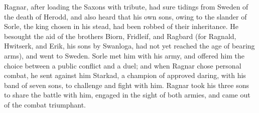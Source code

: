 \documentclass[10pt,a4paper]{report}
\begin{document}
Ragnar, after loading the Saxons with tribute, had sure tidings from Sweden of the death of Herodd, and also heard that his own sons, owing to the slander of Sorle, the king chosen in his stead, had been robbed of their inheritance. He besought the aid of the brothers Biorn, Fridleif, and Ragbard (for Ragnald, Hwitserk, and Erik, his sons by Swanloga, had not yet reached the age of bearing arms), and went to Sweden. Sorle met him with his army, and offered him the choice between a public conflict and a duel; and when Ragnar chose personal combat, he sent against him Starkad, a champion of approved daring, with his band of seven sons, to challenge and fight with him. Ragnar took his three sons to share the battle with him, engaged in the sight of both armies, and came out of the combat triumphant.\\
\end{document}
